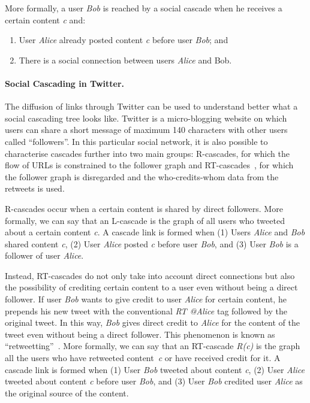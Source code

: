 More formally, a user \emph{Bob} is reached by a social cascade when he receives a certain content
\emph{c} and:
\begin{enumerate}
\singlespacing
	\item User \emph{Alice} already posted content \emph{c} before user \emph{Bob}; and
	\item There is a social connection between users \emph{Alice} and {Bob}.
\end{enumerate}
\paragraph{Social Cascading in Twitter.}
The diffusion of links through Twitter can be used to understand better what a social cascading tree
looks like. Twitter is a micro-blogging website on which users can share a short message of maximum 140
characters with other users called ``followers''. In this particular social network, it is also possible
to characterise cascades further into two main groups: R-cascades, for which the
flow of URLs is constrained to the follower graph and
RT-cascades~\cite{outweeting}, for which the follower graph is disregarded and
the who-credits-whom data from the retweets is used.

R-cascades occur when a certain content is shared by direct followers. More formally, we can
say that an L-cascade is the graph of all users who tweeted about a certain content \emph{c}. A cascade
link is formed when (1) Users \emph{Alice} and \emph{Bob} shared content \emph{c}, (2) User
\emph{Alice} posted \emph{c} before user \emph{Bob}, and (3) User \emph{Bob} is a follower of user
\emph{Alice}.

Instead, RT-cascades do not only take into account direct connections but also the
possibility of crediting certain content to a user even without being a direct follower. If user
\emph{Bob} wants to give credit to user \emph{Alice} for certain content, he prepends his new tweet
with the conventional \emph{RT @Alice} tag followed by the original tweet. In this way, \emph{Bob} gives
direct credit to \emph{Alice} for the content of the tweet even without being a direct follower. This
phenomenon is known as ``retweetting''~\cite{retweet}. More formally, we can say that an RT-cascade
\emph{R(c)} is the graph all the users who have retweeted content~\emph{c} or have received credit for
it.
A cascade link is formed when (1) User \emph{Bob} tweeted about content \emph{c}, (2) User \emph{Alice}
tweeted about content \emph{c} before user \emph{Bob}, and (3) User \emph{Bob} credited user \emph{Alice}
as the original source of the content.
\vspace{-0.5cm}
